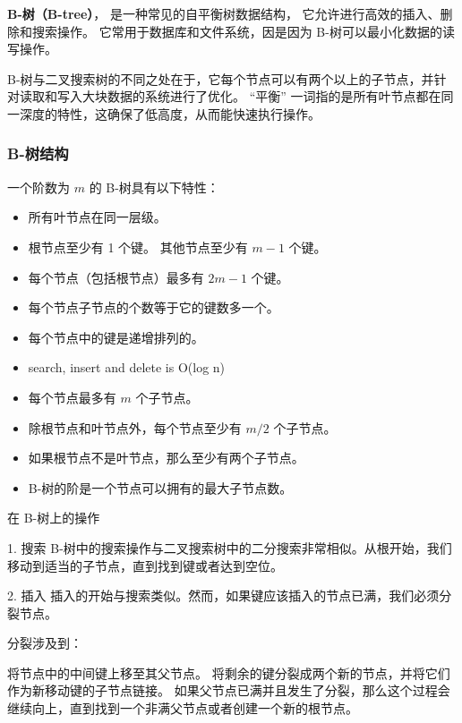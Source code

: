 
\begin{issues}
\issueDraft
\end{issues}


\textbf{B-树（B-tree）}， 是一种常见的自平衡树数据结构， 它允许进行高效的插入、删除和搜索操作。 它常用于数据库和文件系统，因是因为 B-树可以最小化数据的读写操作。

B-树与二叉搜索树的不同之处在于，它每个节点可以有两个以上的子节点，并针对读取和写入大块数据的系统进行了优化。 “平衡” 一词指的是所有叶节点都在同一深度的特性，这确保了低高度，从而能快速执行操作。

\subsubsection{B-树结构}
一个阶数为 $m$ 的 B-树具有以下特性：
\begin{itemize}
\item 所有叶节点在同一层级。
\item 根节点至少有 1 个键。 其他节点至少有 $m-1$ 个键。
\item 每个节点（包括根节点）最多有 $2m-1$ 个键。
\item 每个节点子节点的个数等于它的键数多一个。
\item 每个节点中的键是递增排列的。
\item search, insert and delete is O(log n)


\item 每个节点最多有 $m$ 个子节点。
\item 除根节点和叶节点外，每个节点至少有 $m/2$ 个子节点。
\item 如果根节点不是叶节点，那么至少有两个子节点。


\item B-树的阶是一个节点可以拥有的最大子节点数。
\end{itemize}


在 B-树上的操作

1. 搜索
B-树中的搜索操作与二叉搜索树中的二分搜索非常相似。从根开始，我们移动到适当的子节点，直到找到键或者达到空位。

2. 插入
插入的开始与搜索类似。然而，如果键应该插入的节点已满，我们必须分裂节点。

分裂涉及到：

将节点中的中间键上移至其父节点。
将剩余的键分裂成两个新的节点，并将它们作为新移动键的子节点链接。
如果父节点已满并且发生了分裂，那么这个过程会继续向上，直到找到一个非满父节点或者创建一个新的根节点。

